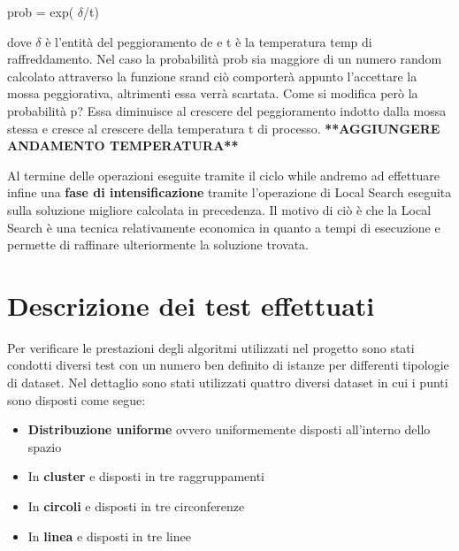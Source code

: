 \documentclass[preprint,12pt]{elsarticle}
\begin{document}
\begin{center}
prob = exp( $\delta$/t)
\end{center}

dove $\delta$ è l'entità del peggioramento de e t è la temperatura temp di raffreddamento. Nel caso la probabilità prob sia maggiore di un numero random calcolato attraverso la funzione srand ciò comporterà appunto l'accettare la mossa peggiorativa, altrimenti essa verrà scartata. Come si modifica però la probabilità p? Essa diminuisce al crescere del peggioramento indotto dalla mossa stessa e cresce al crescere della temperatura t di processo. \textbf{**AGGIUNGERE ANDAMENTO TEMPERATURA**}

Al termine delle operazioni eseguite tramite il ciclo while andremo ad effettuare infine una \textbf{fase di intensificazione} tramite l'operazione di Local Search eseguita sulla soluzione migliore calcolata in precedenza. Il motivo di ciò è che la Local Search è una tecnica relativamente economica in quanto a tempi di esecuzione e permette di raffinare ulteriormente la soluzione trovata.


\section{Descrizione dei test effettuati}
\label{S:3}

Per verificare le prestazioni degli algoritmi utilizzati nel progetto sono stati condotti diversi test con un numero ben definito di istanze per differenti tipologie di dataset. Nel dettaglio sono stati utilizzati quattro diversi dataset in cui i punti sono disposti come segue:

\begin{itemize}
\item \textbf{Distribuzione uniforme} ovvero uniformemente disposti all'interno dello spazio
\item In \textbf{cluster} e disposti in tre raggruppamenti
\item In \textbf{circoli} e disposti in tre circonferenze
\item In \textbf{linea} e disposti in tre linee \\
\end{itemize}
\end{document}
